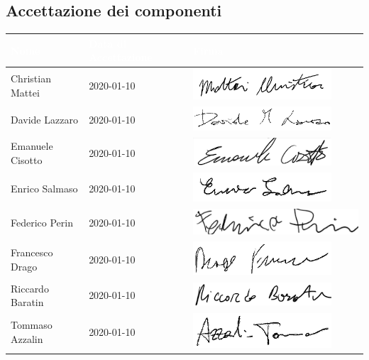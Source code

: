 \subsection{Accettazione dei componenti}
{
	\renewcommand{\arraystretch}{2}
	\begin{longtable}{ C{5cm} C{4cm} C{5cm} }
		\textcolor{white}{\textbf{Nome}} & \textcolor{white}{\textbf{Data di Accettazione}} & \textcolor{white}{\textbf{Firma}}\\	\endhead
		
		
		Christian Mattei & 2020-01-10 & \includegraphics[scale=0.70]{sezioni/Firme/Christian.png}\\
		Davide Lazzaro & 2020-01-10 & \includegraphics[scale=0.60]{sezioni/Firme/Davide.png}\\
		Emanuele Cisotto & 2020-01-10 & \includegraphics[scale=0.70]{sezioni/Firme/Emanuele.png} \\
		Enrico Salmaso & 2020-01-10 & \includegraphics[scale=0.70]{sezioni/Firme/Enrico.png}\\
		Federico Perin & 2020-01-10 & \includegraphics[scale=0.50]{sezioni/Firme/Federico.png}\\
		Francesco Drago & 2020-01-10 & \includegraphics[scale=0.70]{sezioni/Firme/Francesco.png} \\
		Riccardo Baratin & 2020-01-10& \includegraphics[scale=0.70]{sezioni/Firme/Riccardo.png} \\
		Tommaso Azzalin & 2020-01-10 & \includegraphics[scale=0.70]{sezioni/Firme/Tommaso.png} \\
		
		
	\end{longtable}
}

